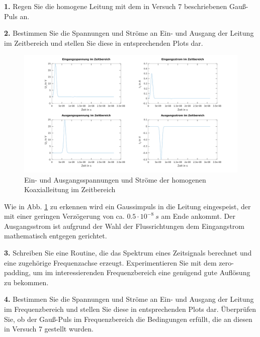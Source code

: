\documentclass[Protokollheft.tex]{subfiles}
\begin{document}
\begin{framed}
	\noindent \textbf{1.} Regen Sie die homogene Leitung mit dem in Versuch 7 beschriebenen
Gauß-Puls an.\label{exer:exciteGauss}
\end{framed}
\begin{framed}
	\noindent \textbf{2.} Bestimmen Sie die Spannungen und Ströme an Ein- und Ausgang der Leitung
 im Zeitbereich und stellen Sie diese in entsprechenden Plots dar.\label{exer:UandVtimeDomain}
\end{framed}
\noindent
\begin{figure}
	\centering
	\includegraphics[width=0.9\linewidth]{EinAusSpanStromZeit}
	\caption{Ein- und Ausgangsspannungen  und Ströme der homogenen Koaxialleitung im Zeitbereich}
	\label{fig:einausspanstromzeit}
\end{figure}
\noindent
Wie in Abb. \ref{fig:einausspanstromzeit} zu erkennen wird ein Gaussimpuls in die Leitung eingespeist, der mit einer geringen Verzögerung von ca. $0.5\cdot 10^{-8} \ \si{s}$  am Ende ankommt. Der Ausgangsstrom ist aufgrund der Wahl der Flussrichtungen dem Eingangstrom mathematisch entgegen gerichtet.  
\begin{framed}
	\noindent \textbf{3.} Schreiben Sie eine Routine, die das Spektrum eines
Zeitsignals berechnet und eine zugehörige Frequenzachse erzeugt.
Experimentieren Sie mit dem zero-padding, um im interessierenden
Frequenzbereich eine genügend gute Auflösung zu bekommen.\label{exer:calcFreqSpectWithAxis}
\end{framed}
\begin{framed}
	\noindent \textbf{4.} Bestimmen Sie die Spannungen und Ströme an Ein- und Ausgang der Leitung 
im Frequenzbereich und stellen Sie diese in entsprechenden Plots dar. Überprüfen Sie, ob 
der Gauß-Puls im Frequenzbereich die Bedingungen erfüllt, die an 
diesen in Versuch 7 gestellt wurden.\label{exer:UandVfreqDomain}
\end{framed}
\end{document}
